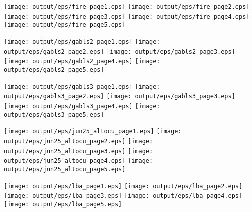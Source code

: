 \documentclass[11pt]{article}
\begin{document}
\begin{center}

\texttt{[image: output/eps/fire\_page1.eps]}
\texttt{[image: output/eps/fire\_page2.eps]}
\texttt{[image: output/eps/fire\_page3.eps]}
\texttt{[image: output/eps/fire\_page4.eps]}
\texttt{[image: output/eps/fire\_page5.eps]}
\end{center}
\newpage

\begin{center}

\texttt{[image: output/eps/gabls2\_page1.eps]}
\texttt{[image: output/eps/gabls2\_page2.eps]}
\texttt{[image: output/eps/gabls2\_page3.eps]}
\texttt{[image: output/eps/gabls2\_page4.eps]}
\texttt{[image: output/eps/gabls2\_page5.eps]}
\end{center}
\newpage

\begin{center}

\texttt{[image: output/eps/gabls3\_page1.eps]}
\texttt{[image: output/eps/gabls3\_page2.eps]}
\texttt{[image: output/eps/gabls3\_page3.eps]}
\texttt{[image: output/eps/gabls3\_page4.eps]}
\texttt{[image: output/eps/gabls3\_page5.eps]}
\end{center}
\newpage

\begin{center}

\texttt{[image: output/eps/jun25\_altocu\_page1.eps]}
\texttt{[image: output/eps/jun25\_altocu\_page2.eps]}
\texttt{[image: output/eps/jun25\_altocu\_page3.eps]}
\texttt{[image: output/eps/jun25\_altocu\_page4.eps]}
\texttt{[image: output/eps/jun25\_altocu\_page5.eps]}
\end{center}
\newpage

\begin{center}

\texttt{[image: output/eps/lba\_page1.eps]}
\texttt{[image: output/eps/lba\_page2.eps]}
\texttt{[image: output/eps/lba\_page3.eps]}
\texttt{[image: output/eps/lba\_page4.eps]}
\texttt{[image: output/eps/lba\_page5.eps]}
\end{center}
\newpage
\end{document}
